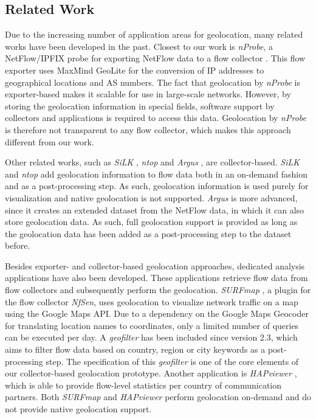 \subsection{Related Work} \label{subsec:geo-related_work}

Due to the increasing number of application areas for geolocation, many related works have been developed in the past. Closest to our work is \textit{nProbe}, a NetFlow/IPFIX probe for exporting NetFlow data to a flow collector \cite{--nProbe}. This flow exporter uses MaxMind GeoLite \cite{MaxMind--GeoLite} for the conversion of IP addresses to geographical locations and AS numbers. The fact that geolocation by \textit{nProbe} is exporter-based makes it scalable for use in large-scale networks. However, by storing the geolocation information in special fields, software support by collectors and applications is required to access this data. Geolocation by \textit{nProbe} is therefore not transparent to any flow collector, which makes this approach different from our work.

Other related works, such as \textit{SiLK} \cite{CERTNSAT--SiLK}, \textit{ntop} \cite{--ntop} and \textit{Argus} \cite{QoSient--ARGUS}, are collector-based. \textit{SiLK} and \textit{ntop} add geolocation information to flow data both in an on-demand fashion and as a post-processing step. As such, geolocation information is used purely for visualization and native geolocation is not supported. \textit{Argus} is more advanced, since it creates an extended dataset from the NetFlow data, in which it can also store geolocation data. As such, full geolocation support is provided as long as the geolocation data has been added as a post-processing step to the dataset before.

Besides exporter- and collector-based geolocation approaches, dedicated analysis applications have also been developed. These applications retrieve flow data from flow collectors and subsequently perform the geolocation. \textit{SURFmap} \cite{Hofstede--SURFmap, Hofstede-2009-SURFmap}, a plugin for the flow collector \textit{NfSen}, uses geolocation to visualize network traffic on a map using the Google Maps API. Due to a dependency on the Google Maps Geocoder for translating location names to coordinates, only a limited number of queries can be executed per day. A \textit{geofilter} has been included since version 2.3, which aims to filter flow data based on country, region or city keywords as a post-processing step. The specification of this \textit{geofilter} is one of the core elements of our collector-based geolocation prototype. Another application is \textit{HAPviewer} \cite{Blatter-2011-Extending}, which is able to provide flow-level statistics per country of communication partners. Both \textit{SURFmap} and \textit{HAPviewer} perform geolocation on-demand and do not provide native geolocation support.


